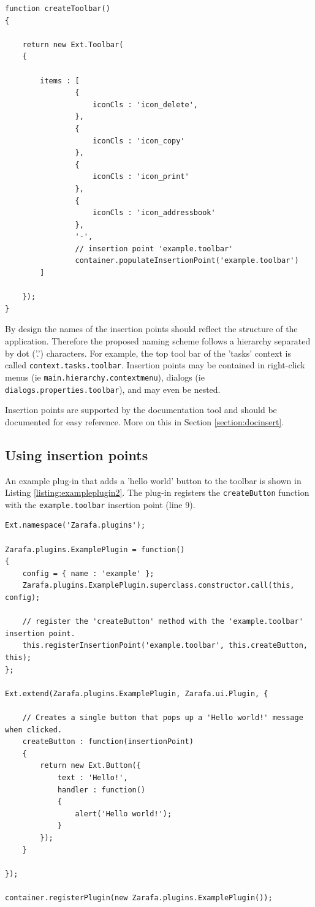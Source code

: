 \begin{lstlisting}[caption={Insertion point.}, label=listing:insertionpoints]
function createToolbar()
{

	return new Ext.Toolbar(
	{

		items : [
				{
					iconCls : 'icon_delete',
				},
				{
					iconCls : 'icon_copy'
				},
				{
					iconCls : 'icon_print'
				},
				{
					iconCls : 'icon_addressbook'
				}, 
				'-',
				// insertion point 'example.toolbar'
				container.populateInsertionPoint('example.toolbar')
		]

	});
}
\end{lstlisting}

By design the names of the insertion points should reflect the structure of the application. Therefore
the proposed naming scheme follows a hierarchy separated by dot ('.') characters. For example, the
top tool bar of the 'tasks' context is called {\tt context.tasks.toolbar}. Insertion points may be contained 
in right-click menus (ie {\tt main.hierarchy.contextmenu}), dialogs (ie {\tt dialogs.properties.toolbar}),
and may even be nested.

Insertion points are supported by the documentation tool and should be documented for easy reference. More
on this in Section \ref{section:docinsert}.

\subsection{Using insertion points}

An example plug-in that adds a 'hello world' button to the toolbar is shown in Listing \ref{listing:exampleplugin2}. 
The plug-in registers the {\tt createButton} function with the {\tt example.toolbar} insertion point (line 9). 

\begin{lstlisting}[caption={Using an insertion point.}, label=listing:exampleplugin2]
Ext.namespace('Zarafa.plugins');

Zarafa.plugins.ExamplePlugin = function()
{
	config = { name : 'example' };
	Zarafa.plugins.ExamplePlugin.superclass.constructor.call(this, config);
	
	// register the 'createButton' method with the 'example.toolbar' insertion point.
	this.registerInsertionPoint('example.toolbar', this.createButton, this);
};

Ext.extend(Zarafa.plugins.ExamplePlugin, Zarafa.ui.Plugin, {
	
	// Creates a single button that pops up a 'Hello world!' message when clicked.
	createButton : function(insertionPoint)
	{
		return new Ext.Button({
			text : 'Hello!',
			handler : function()
			{
				alert('Hello world!');
			}
		});
	}	
	
});

container.registerPlugin(new Zarafa.plugins.ExamplePlugin());\end{lstlisting}

